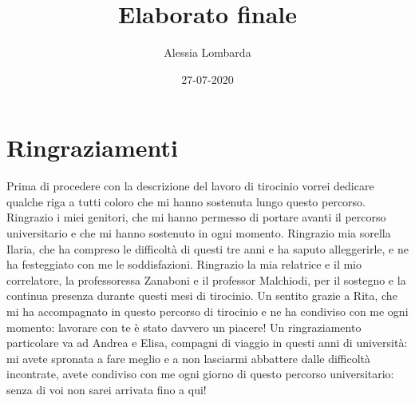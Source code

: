 \documentclass[oneside, openany]{book}
\title{Elaborato finale}
\date{27-07-2020}
\author{Alessia Lombarda}
\begin{document}
	\begin{titlepage}
		
	\end{titlepage}
	\frontmatter
	\chapter*{Ringraziamenti}
	Prima di procedere con la descrizione del lavoro di tirocinio vorrei dedicare qualche riga a tutti coloro che mi hanno sostenuta lungo questo percorso.
	Ringrazio i miei genitori, che mi hanno permesso di portare avanti il percorso universitario e che mi hanno sostenuto in ogni momento. Ringrazio mia sorella Ilaria, che ha compreso le difficoltà di questi tre anni e ha saputo alleggerirle, e ne ha festeggiato con me le soddisfazioni.
	Ringrazio la mia relatrice e il mio correlatore, la professoressa Zanaboni e il professor Malchiodi, per il sostegno e la continua presenza durante questi mesi di tirocinio.
	Un sentito grazie a Rita, che mi ha accompagnato in questo percorso di tirocinio e ne ha condiviso con me ogni momento: lavorare con te è stato davvero un piacere!
	Un ringraziamento particolare va ad Andrea e Elisa, compagni di viaggio in questi anni di università: mi avete spronata a fare meglio e a non lasciarmi abbattere dalle difficoltà incontrate, avete condiviso con me ogni giorno di questo percorso universitario: senza di voi non sarei arrivata fino a qui!
	\tableofcontents
	\mainmatter
\end{document}
